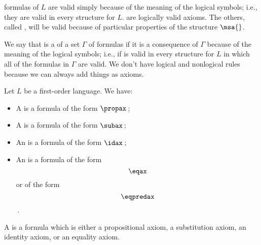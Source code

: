  formulas of $L$ are valid simply because of the meaning of the logical symbols;
i.e., they are valid in every structure for $L$.
 are logically valid axioms.
The others, called , will be valid because of particular properties of the structure $\msa{}$.

We say that \A{} is a  of a set $\Gamma$ of formulas if it is a consequence of $\Gamma$ because of the meaning of the logical symbols;
i.e., if \A{} is valid in every structure for $L$ in which all of the formulas in $\Gamma$ are valid.
We don't have logical and nonlogical rules because we can always add things as axioms.

Let $L$ be a first-order language. We have:
\begin{itemize}
    \item A  is a formula of the form $\propax$\,;
    \item A  is a formula of the form $\subax$\,;
    \item An  is a formula of the form $\idax$\,;
    \item An  is a formula of the form \[\eqax\] or of the form \[\eqpredax\]\,.
\end{itemize}
A  is a formula which is either a propositional axiom, a substitution axiom, an identity axiom, or an equality axiom.

